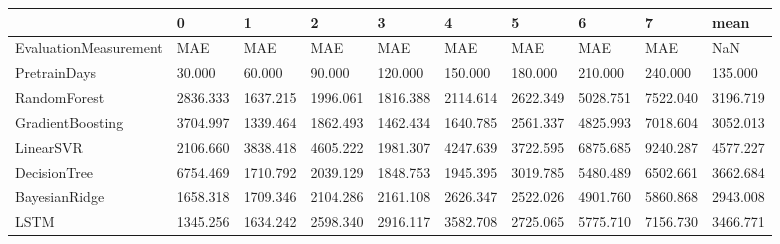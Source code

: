 \begin{tabular}{llllllllll}
\toprule
{} &        0 &        1 &        2 &        3 &        4 &        5 &        6 &        7 &     mean \\
\midrule
EvaluationMeasurement &      MAE &      MAE &      MAE &      MAE &      MAE &      MAE &      MAE &      MAE &      NaN \\
PretrainDays          &   30.000 &   60.000 &   90.000 &  120.000 &  150.000 &  180.000 &  210.000 &  240.000 &  135.000 \\
RandomForest          & 2836.333 & 1637.215 & 1996.061 & 1816.388 & 2114.614 & 2622.349 & 5028.751 & 7522.040 & 3196.719 \\
GradientBoosting      & 3704.997 & 1339.464 & 1862.493 & 1462.434 & 1640.785 & 2561.337 & 4825.993 & 7018.604 & 3052.013 \\
LinearSVR             & 2106.660 & 3838.418 & 4605.222 & 1981.307 & 4247.639 & 3722.595 & 6875.685 & 9240.287 & 4577.227 \\
DecisionTree          & 6754.469 & 1710.792 & 2039.129 & 1848.753 & 1945.395 & 3019.785 & 5480.489 & 6502.661 & 3662.684 \\
BayesianRidge         & 1658.318 & 1709.346 & 2104.286 & 2161.108 & 2626.347 & 2522.026 & 4901.760 & 5860.868 & 2943.008 \\
LSTM                  & 1345.256 & 1634.242 & 2598.340 & 2916.117 & 3582.708 & 2725.065 & 5775.710 & 7156.730 & 3466.771 \\
\bottomrule
\end{tabular}
